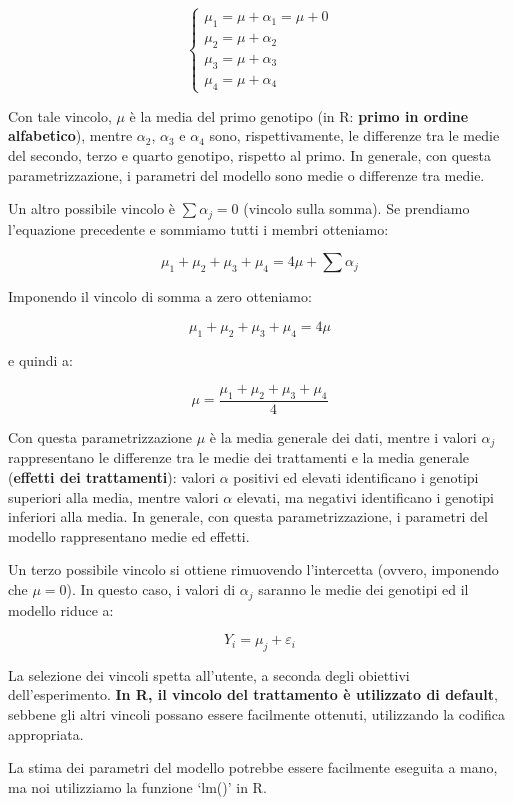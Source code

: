 \documentclass[
  12pt,
]{book}
\begin{document}
\[\left\{ {\begin{array}{l}
\mu_1 = \mu + \alpha_1 = \mu + 0\\
\mu_2 = \mu + \alpha_2 \\
\mu_3 = \mu + \alpha_3 \\
\mu_4 = \mu + \alpha_4
\end{array}} \right.\]

Con tale vincolo, \(\mu\) è la media del primo genotipo (in R: \textbf{primo in ordine alfabetico}), mentre \(\alpha_2\), \(\alpha_3\) e \(\alpha_4\) sono, rispettivamente, le differenze tra le medie del secondo, terzo e quarto genotipo,
rispetto al primo. In generale, con questa parametrizzazione, i parametri del modello sono medie o differenze tra medie.

Un altro possibile vincolo è \(\sum{\alpha_j} = 0\) (vincolo sulla somma). Se prendiamo l'equazione precedente e sommiamo tutti i membri otteniamo:

\[\mu_1 + \mu_2 + \mu_3 + \mu_4 = 4 \mu + \sum{\alpha_j}\]

Imponendo il vincolo di somma a zero otteniamo:

\[\mu_1 + \mu_2 + \mu_3 + \mu_4 = 4 \mu\]

e quindi a:

\[\mu = \frac{\mu_1 + \mu_2 + \mu_3 + \mu_4}{4}\]

Con questa parametrizzazione \(\mu\) è la media generale dei dati, mentre i valori \(\alpha_j\) rappresentano le differenze tra le medie dei trattamenti e la media generale (\textbf{effetti dei trattamenti}): valori \(\alpha\) positivi ed elevati identificano i genotipi superiori alla media, mentre valori \(\alpha\) elevati, ma negativi identificano i genotipi inferiori alla media. In generale, con questa parametrizzazione, i parametri del modello rappresentano medie ed effetti.

Un terzo possibile vincolo si ottiene rimuovendo l'intercetta (ovvero, imponendo che \(\mu = 0\)). In questo caso, i valori di \(\alpha_j\) saranno le medie dei genotipi ed il modello riduce a:

\[Y_i = \mu_j + \varepsilon_i\]

La selezione dei vincoli spetta all'utente, a seconda degli obiettivi dell'esperimento. \textbf{In R, il vincolo del trattamento è utilizzato di default}, sebbene gli altri vincoli possano essere facilmente ottenuti, utilizzando la codifica appropriata.

La stima dei parametri del modello potrebbe essere facilmente eseguita a mano, ma noi utilizziamo la funzione `lm()' in R.
\end{document}
